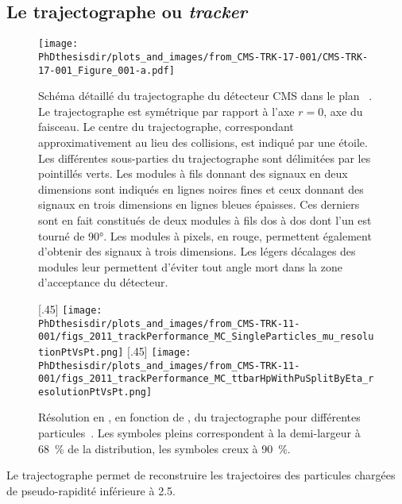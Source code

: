 \subsection{Le trajectographe ou \emph{tracker}}\label{chapter-LHC-section-CMS-subsec-tracker}
\begin{figure}[p]
\centering
\texttt{[image: \\PhDthesisdir/plots\_and\_images/from\_CMS-TRK-17-001/CMS-TRK-17-001\_Figure\_001-a.pdf]}
\caption[Schéma détaillé du trajectographe du détecteur CMS.]{Schéma détaillé du trajectographe du détecteur CMS dans le plan ~\cite{CMS-TRK-11-001,CMS-TRK-17-001}. Le trajectographe est symétrique par rapport à l'axe $r=0$, axe du faisceau. Le centre du trajectographe, correspondant approximativement au lieu des collisions, est indiqué par une étoile. Les différentes sous-parties du trajectographe sont délimitées par les pointillés verts. Les modules à fils donnant des signaux en deux dimensions sont indiqués en lignes noires fines et ceux donnant des signaux en trois dimensions en lignes bleues épaisses. Ces derniers sont en fait constitués de deux modules à fils dos à dos dont l'un est tourné de \ang{90}. Les modules à pixels, en rouge, permettent également d'obtenir des signaux à trois dimensions. Les légers décalages des modules leur permettent d'éviter tout angle mort dans la zone d'acceptance du détecteur.}
\label{fig-CMS-trk_detailed_scheme}
\end{figure}
\begin{figure}[p]
\centering
{}[.45\textwidth]
{\texttt{[image: \\PhDthesisdir/plots\_and\_images/from\_CMS-TRK-11-001/figs\_2011\_trackPerformance\_MC\_SingleParticles\_mu\_resolutionPtVsPt.png]}}
\hfill
{}[.45\textwidth]
{\texttt{[image: \\PhDthesisdir/plots\_and\_images/from\_CMS-TRK-11-001/figs\_2011\_trackPerformance\_MC\_ttbarHpWithPuSplitByEta\_resolutionPtVsPt.png]}}
\caption[Résolution en \pT\ du trajectographe.]{Résolution en \pT, en fonction de \pT, du trajectographe pour différentes particules~\cite{CMS-TRK-11-001}. Les symboles pleins correspondent à la demi-largeur à \SI{68}{\%} de la distribution, les symboles creux à \SI{90}{\%}.}
\label{fig-chapter-LHC-section-CMS-subsec-tracker-pT-resolution}
\end{figure}
Le trajectographe permet de reconstruire les trajectoires des particules chargées de pseudo-rapidité inférieure à \num{2.5}.

